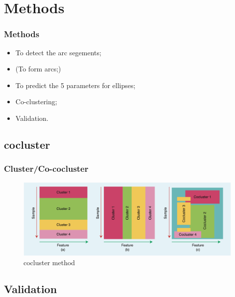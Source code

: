 \documentclass[aspectratio=169]{beamer}
\begin{document}
    \section{Methods}
    \begin{frame}
        \frametitle{Methods}
    
        \begin{itemize}
            \item To detect the arc segements;
            \item (To form arcs;)
            \item To predict the 5 parameters for ellipses;
            \item Co-clustering;
            \item Validation.
        \end{itemize}
    
    \end{frame}
    \subsection{cocluster}
    \begin{frame}
        \frametitle{Cluster/Co-cocluster}

        \begin{figure}
            \includegraphics[width=0.8\linewidth]{pic/cocluster.png}
            \caption{cocluster method}
        \end{figure} 
    \end{frame}
    \subsection{Validation}
\end{document}
